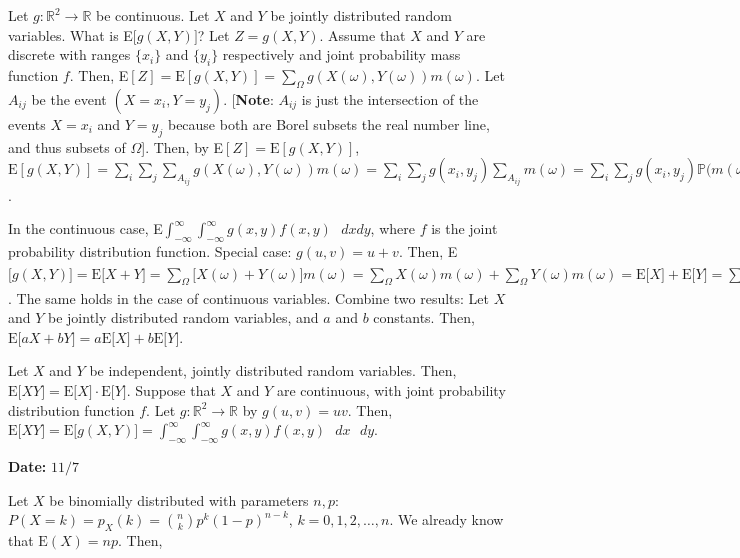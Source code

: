 \documentclass[12pt]{article}
\newcommand{\R}{\mathbb{R}}
\newcommand{\prob}[1]{\mathbb{P}(#1)}
\newcommand{\nspace}{\vspace*{.5cm}}
\newcommand{\nline}{\nspace \noindent}
\newcommand{\expected}[1]{\text{E}(#1)}
\begin{document}
\nline
Let $g : \R^2 \rightarrow \R$ be continuous. Let $X$ and $Y$ be jointly distributed random variables. What is E$\big [ g(X,Y) \big ]$? Let $Z = g(X,Y)$. Assume that $X$ and $Y$ are discrete with ranges $\{ x_i \}$ and $\{ y_i \}$ respectively and joint probability mass function $f$. Then, E$[Z] = \text{E}[g(X,Y)] = \sum_{\Omega} g(X(\omega), Y(\omega)) m(\omega)$. Let $A_{ij}$ be the event $(X = x_i, Y = y_j)$. [\textbf{Note}: $A_{ij}$ is just the intersection of the events $X=x_i$ and $Y=y_j$ because both are Borel subsets the real number line, and thus subsets of $\Omega$]. Then, by E$[Z] = \text{E}[g(X,Y)]$, $\text{E}[g(X,Y)] = \sum_{i} \sum_{j} \sum_{A_{ij}} g(X(\omega), Y(\omega)) m(\omega) = \sum_{i} \sum_{j} g(x_i, y_j) \sum_{A_{ij}} m(\omega) = \sum_{i} \sum_{j} g(x_i, y_j) \prob{m(\omega} = \sum_{i} \sum_{j} g(x_i, y_j) p(x_i, y_j)$.



In the continuous case, E$\int_{- \infty}^{\infty} \int_{- \infty}^{\infty} g(x,y) f(x,y) \text{ } dxdy$, where $f$ is the joint probability distribution function. Special case: $g(u,v) = u+v$. Then, E$\Big [ g(X,Y) \Big ] = \text{E}\Big [ X + Y \Big ] = \sum_{\Omega} \Big [ X(\omega) + Y(\omega) \Big ] m(\omega) = \sum_{\Omega}  X(\omega) m(\omega) + \sum_{\Omega} Y(\omega) m(\omega) = \text{E}\Big [ X \Big ] + \text{E}\Big [ Y \Big ] = \sum_{i} x_i p_X (x_i) + \sum_{j} y_j p_Y (y_j)$. The same holds in the case of continuous variables. Combine two results: Let $X$ and $Y$ be jointly distributed random variables, and $a$ and $b$ constants. Then, $\text{E} \Big [ aX + bY \Big] = a \text{E} [ X \Big] + b \text{E}[ Y \Big]$.

\nline
Let $X$ and $Y$ be independent, jointly distributed random variables. Then, $\text{E} \Big [ XY \Big] = \text{E} \Big [ X \Big] \cdot \text{E} \Big [ Y \Big] $. Suppose that $X$ and $Y$ are continuous, with joint probability distribution function $f$. Let $g : \R^2 \rightarrow \R$ by $g(u,v) = uv$. Then, $\text{E} \Big [ XY \Big] = \text{E} \Big [ g(X,Y) \Big] = \int_{- \infty}^{\infty} \int_{- \infty}^{\infty} g(x,y) f(x,y) \text{ } dx \text{ } dy$.


\begin{flushright}
\textbf{Date:} $11/7$
\end{flushright}

\nline
Let $X$ be binomially distributed with parameters $n,p$: $P(X = k) = p_X(k) = {n \choose k} p^k (1-p)^{n-k}$, $k=0,1,2, \ldots, n$. We already know that $\expected{X} = np$. Then, 
\end{document}
